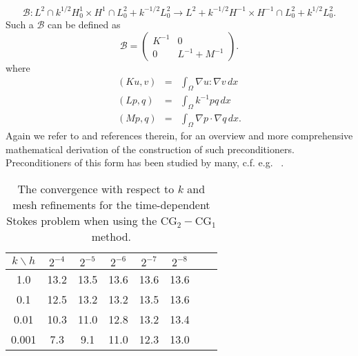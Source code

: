 \[
\mathcal{B}: L^2 \cap k^{1/2} H^1_0 \times H^1 \cap L_0^2 + k^{-1/2} L_0^2 \rightarrow 
L^2 + k^{-1/2} H^{-1} \times H^{-1} \cap L_0^2 + k^{1/2} L_0^2  .
\] 
Such a $\mathcal{B}$ can be defined as 
\[
\mathcal{B} 
= 
\begin{pmatrix} K^{-1} & 0 \\ 0 & L^{-1} + M^{-1} \end{pmatrix}.
\]
where 
\begin{eqnarray}
(K u, v) &=& \int_\Omega \nabla u: \nabla v \, dx \\ 
(L p, q) &=& \int_\Omega k^{-1} p q \, dx \\   
(M p, q) &=& \int_\Omega \nabla p \cdot  \nabla q \, dx .   
\end{eqnarray}
Again we refer to \cite{MardalWinther} and references therein,  for an overview and more comprehensive mathematical derivation 
of the construction of such preconditioners.  
Preconditioners of this form has been studied by many, c.f. e.g. ~\cite{CahouetChabard1988, E-S-W-text, M-W-04, M-W-09, T-99}. 

\begin{table}
\begin{center}
\begin{tabular}{|c|c||c|c|c|c|c|c|}
\hline
$k\backslash h$ & $2^{-4}$ & $2^{-5}$ & $2^{-6}$ & $2^{-7}$ & $2^{-8}$ \\ \hline\hline
1.0 & 13.2 & 13.5 & 13.6 & 13.6 & 13.6 \\ \hline 
0.1 & 12.5 & 13.2 & 13.2 & 13.5 & 13.6 \\ \hline 
0.01 & 10.3 & 11.0 & 12.8 & 13.2 & 13.4 \\ \hline 
0.001 & 7.3 & 9.1 & 11.0 & 12.3  & 13.0 \\ \hline 
\end{tabular}
\caption{The convergence with respect to $k$ and mesh refinements for the time-dependent Stokes problem 
when using the $\mathrm{CG}_2-\mathrm{CG}_1$ method.}\label{timestokes:ex} 
\end{center}
\end{table}

